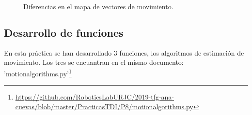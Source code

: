 \begin{figure}[!tbp]
  \centering
  \hfill
  \hfill
  \caption{Diferencias en el mapa de vectores de movimiento.}
  \label{arrow}
\end{figure}
\subsection{Desarrollo de funciones}

En esta práctica se han desarrollado 3 funciones, los algoritmos de estimación de movimiento. Los tres se encuantran en el mismo documento: 'motionalgorithms.py'\footnote{\url{https://github.com/RoboticsLabURJC/2019-tfg-ana-cuevas/blob/master/PracticasTDI/P8/motionalgorithms.py}}\\

